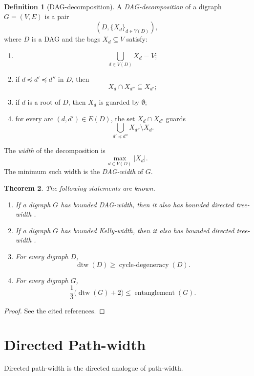\documentclass[10pt]{book}
\newtheorem{theorem}{Theorem}[section]
\theoremstyle{definition}
\newtheorem{definition}[theorem]{Definition}
\begin{document}
\begin{definition}[DAG-decomposition]
\label{def:DAGdecomp}
\cite{berwanger2006dag}
A \emph{DAG-decomposition} of a digraph \(G=(V,E)\) is a pair
\[
(D,\{X_d\}_{d\in V(D)}),
\]
where \(D\) is a DAG and the bags \(X_d\subseteq V\) satisfy:
\begin{enumerate}
    \item
    \[
    \bigcup_{d\in V(D)} X_d = V;
    \]
    \item if \(d\preceq d'\preceq d''\) in \(D\), then
    \[
    X_d\cap X_{d''}\subseteq X_{d'};
    \]
    \item if \(d\) is a root of \(D\), then \(X_d\) is guarded by \(\emptyset\);
    \item for every arc \((d,d')\in E(D)\), the set \(X_d\cap X_{d'}\) guards
    \[
    \bigcup_{d'\preceq d''}X_{d''}\setminus X_d.
    \]
\end{enumerate}

The \emph{width} of the decomposition is
\[
\max_{d\in V(D)} |X_d|.
\]
The minimum such width is the \emph{DAG-width} of \(G\).
\end{definition}

\begin{theorem}
The following statements are known.
\begin{enumerate}
    \item If a digraph \(G\) has bounded DAG-width, then it also has bounded directed tree-width \cite{368}.

    \item If a digraph \(G\) has bounded Kelly-width, then it also has bounded directed tree-width \cite{368,369}.

    \item For every digraph \(D\),
    \[
    \operatorname{dtw}(D)\geq \operatorname{cycle\mbox{-}degeneracy}(D).
    \]

    \item For every digraph \(G\),
    \[
    \frac{1}{3}\bigl(\operatorname{dtw}(G)+2\bigr)\leq \operatorname{entanglement}(G).
    \]
    \cite{johnson2001directed}
\end{enumerate}
\end{theorem}

\begin{proof}
See the cited references.
\end{proof}

\section{Directed Path-width}
Directed path-width \cite{67,70} is the directed analogue of path-width.
\end{document}
